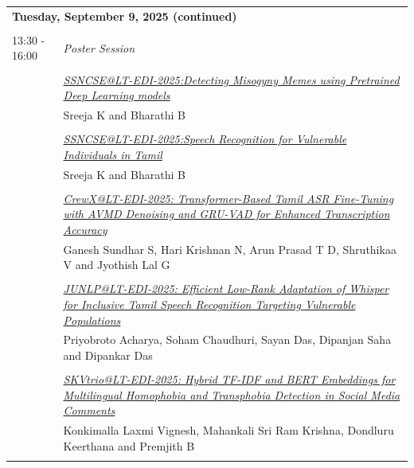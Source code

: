 \documentclass[11pt,oneside]{book}
\begin{document}
    
    \begin{tabular}{p{24mm}p{124mm}}
    \multicolumn{2}{l}{\bf Tuesday, September 9, 2025 (continued)} \\\\
                  13:30 - 16:00 & \emph{Poster Session}\\\\
      
                
                      & \hyperlink{page.1}{\emph{SSNCSE@LT-EDI-2025:Detecting Misogyny Memes using Pretrained Deep Learning models}}\\
        & Sreeja K\index{K} and Bharathi B\index{B}\\\\
                
                      & \hyperlink{page.6}{\emph{SSNCSE@LT-EDI-2025:Speech Recognition for Vulnerable Individuals in Tamil}}\\
        & Sreeja K\index{K} and Bharathi B\index{B}\\\\
                
                      & \hyperlink{page.11}{\emph{CrewX@LT-EDI-2025: Transformer-Based Tamil ASR Fine-Tuning with AVMD Denoising and GRU-VAD for Enhanced Transcription Accuracy}}\\
        & Ganesh Sundhar S\index{S}, Hari Krishnan N\index{N}, Arun Prasad T D\index{D}, Shruthikaa V\index{V} and Jyothish Lal G\index{G}\\\\
                
                      & \hyperlink{page.17}{\emph{JUNLP@LT-EDI-2025: Efficient Low-Rank Adaptation of Whisper for Inclusive Tamil Speech Recognition Targeting Vulnerable Populations}}\\
        & Priyobroto Acharya\index{Acharya}, Soham Chaudhuri\index{Chaudhuri}, Sayan Das\index{Das}, Dipanjan Saha\index{Saha} and Dipankar Das\index{Das}\\\\
                
                      & \hyperlink{page.26}{\emph{SKVtrio@LT-EDI-2025: Hybrid TF-IDF and BERT Embeddings for  Multilingual Homophobia and Transphobia Detection in Social Media  Comments}}\\
        & Konkimalla Laxmi Vignesh\index{Vignesh}, Mahankali Sri Ram Krishna\index{Krishna}, Dondluru Keerthana\index{Keerthana} and Premjith B\index{B}\\\\
                

\end{tabular}
\end{document}
